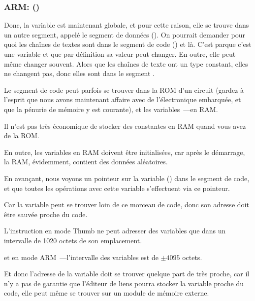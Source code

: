 \subsubsection{ARM: \OptimizingKeilVI (\ThumbMode)}



Donc, la variable  est maintenant globale, et pour cette raison, elle se trouve
dans un autre segment, appelé le segment de données ().
On pourrait demander pour quoi les chaînes de textes sont dans le segment de code
() et  là.
C'est parque c'est une variable et que par définition sa valeur peut changer. En
outre, elle peut même changer souvent.
Alors que les chaînes de texte ont un type constant, elles ne changent pas, donc
elles sont dans le segment .
\myindex{\RAM}
\myindex{\ROM}

Le segment de code peut parfois se trouver dans la \ac{ROM} d'un circuit (gardez
à l'esprit que nous avons maintenant affaire avec de l'électronique embarquée, et
que la pénurie de mémoire y est courante), et les variables~---en \ac{RAM}.

Il n'est pas très économique de stocker des constantes en RAM quand vous avez de
la ROM.

En outre, les variables en RAM doivent être initialisées, car après le démarrage,
la RAM, évidemment, contient des données aléatoires.


En avançant, nous voyons un pointeur sur la variable  () dans
le segment de code, et que toutes les opérations avec cette variable s'effectuent
via ce pointeur.

Car la variable  peut se trouver loin de ce morceau de code, donc son adresse
doit être sauvée proche du code.

L'instruction  en mode Thumb ne peut adresser des variables que dans un
intervalle de 1020 octets de son emplacement.

et en mode ARM~---l'intervalle des variables est de $\pm{}4095$ octets.

Et donc l'adresse de la variable  doit se trouver quelque part de très proche,
car il n'y a pas de garantie que l'éditeur de liens pourra stocker la variable proche
du code, elle peut même se trouver sur un module de mémoire externe.

\myindex{\ROM}


